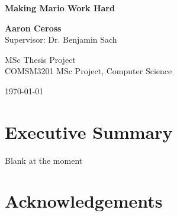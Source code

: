 \documentclass[11pt, a4paper, oneside]{report} %
\begin{document}

\begin{titlepage}
    \begin{center}
        \vspace*{4cm}

        \Huge\textbf{Making Mario Work Hard}


        \vspace{2.5cm}

       \Large\textbf{Aaron Ceross}
       \\Supervisor: Dr. Benjamin Sach

        \vspace{0.8cm}

        MSc Thesis Project\\
        COMSM3201 MSc Project, Computer Science
        \vspace{0.8cm}
        \vspace{0.8cm}


        \today

    \end{center}
\end{titlepage}



\chapter*{Executive Summary}

Blank at the moment


\chapter*{Acknowledgements}
\end{document}
